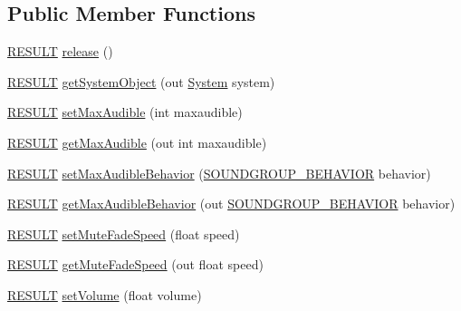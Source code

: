 \subsection*{Public Member Functions}
\begin{DoxyCompactItemize}
\item 
\hyperlink{namespace_f_m_o_d_a305d1176ef3f8c8815861a60407ac33d}{R\+E\+S\+U\+LT} \hyperlink{class_f_m_o_d_1_1_sound_group_a9bb0b3fae5f856aa57fcb606e6deddc1}{release} ()
\item 
\hyperlink{namespace_f_m_o_d_a305d1176ef3f8c8815861a60407ac33d}{R\+E\+S\+U\+LT} \hyperlink{class_f_m_o_d_1_1_sound_group_adc184d4f394931e221aab789388d87e5}{get\+System\+Object} (out \hyperlink{class_f_m_o_d_1_1_system}{System} system)
\item 
\hyperlink{namespace_f_m_o_d_a305d1176ef3f8c8815861a60407ac33d}{R\+E\+S\+U\+LT} \hyperlink{class_f_m_o_d_1_1_sound_group_ac0997b73603f4a10e8f0d211a7055065}{set\+Max\+Audible} (int maxaudible)
\item 
\hyperlink{namespace_f_m_o_d_a305d1176ef3f8c8815861a60407ac33d}{R\+E\+S\+U\+LT} \hyperlink{class_f_m_o_d_1_1_sound_group_adc8e64e12d32bfb5bd6fe06f3af8b6eb}{get\+Max\+Audible} (out int maxaudible)
\item 
\hyperlink{namespace_f_m_o_d_a305d1176ef3f8c8815861a60407ac33d}{R\+E\+S\+U\+LT} \hyperlink{class_f_m_o_d_1_1_sound_group_ad552379d4266a3709d25d2f4c7693d98}{set\+Max\+Audible\+Behavior} (\hyperlink{namespace_f_m_o_d_a94f1c442afacdfb52f62fc4ef91f425b}{S\+O\+U\+N\+D\+G\+R\+O\+U\+P\+\_\+\+B\+E\+H\+A\+V\+I\+OR} behavior)
\item 
\hyperlink{namespace_f_m_o_d_a305d1176ef3f8c8815861a60407ac33d}{R\+E\+S\+U\+LT} \hyperlink{class_f_m_o_d_1_1_sound_group_a972114fe709bbbbb765c13703b87c83c}{get\+Max\+Audible\+Behavior} (out \hyperlink{namespace_f_m_o_d_a94f1c442afacdfb52f62fc4ef91f425b}{S\+O\+U\+N\+D\+G\+R\+O\+U\+P\+\_\+\+B\+E\+H\+A\+V\+I\+OR} behavior)
\item 
\hyperlink{namespace_f_m_o_d_a305d1176ef3f8c8815861a60407ac33d}{R\+E\+S\+U\+LT} \hyperlink{class_f_m_o_d_1_1_sound_group_aaf859d2d7f883a05309de648e750ff48}{set\+Mute\+Fade\+Speed} (float speed)
\item 
\hyperlink{namespace_f_m_o_d_a305d1176ef3f8c8815861a60407ac33d}{R\+E\+S\+U\+LT} \hyperlink{class_f_m_o_d_1_1_sound_group_a482cb6a3ff5236871d63325f16f931ae}{get\+Mute\+Fade\+Speed} (out float speed)
\item 
\hyperlink{namespace_f_m_o_d_a305d1176ef3f8c8815861a60407ac33d}{R\+E\+S\+U\+LT} \hyperlink{class_f_m_o_d_1_1_sound_group_a9c5a0509676c6941fee8566f94aeff48}{set\+Volume} (float volume)

\end{DoxyCompactItemize}
